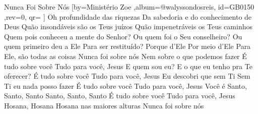 \beginsong
{Nunca Foi Sobre Nós %
}[by={Ministério Zoe %
},album={@walyssondosreis},
id={GB0150 %
},rev={0}, %
qr={ %
}]
\beginverse*
Oh profundidade das riquezas
Da sabedoria e do conhecimento de Deus
Quão insondáveis são os Teus juízos
Quão impenetráveis os Teus caminhos
\endverse
\beginverse*
Quem pois conheceu a mente do Senhor?
Ou quem foi o Seu conselheiro?
Ou quem primeiro deu a Ele
Para ser restituído?
\endverse
\beginchorus
Porque d'Ele
Por meio d'Ele
Para Ele, são todas as coisas
\endchorus
\beginverse*
Nunca foi sobre nós
Nem sobre o que podemos fazer
É tudo sobre você
Tudo para você, Jesus
\endverse
\beginverse*
E quem sou eu?
E o que eu tenho pra Te oferecer?
É tudo sobre você
Tudo para você, Jesus
\endverse
\beginverse*
Eu descobri que sem Ti
Sem Ti eu nada posso fazer
É tudo sobre você
Tudo para você, Jesus
\endverse
\beginverse*
Você é Santo, Santo, Santo
Santo, Santo, Santo
É tudo sobre você
Tudo para você, Jesus
\endverse
\beginverse*
Hosana, Hosana
Hosana nas maiores alturas
\endverse
\beginverse*
Nunca foi sobre nós
\endverse

